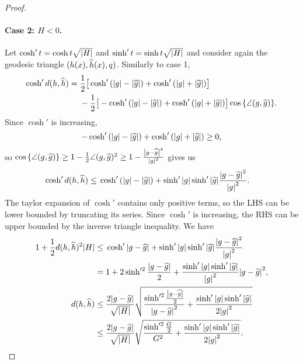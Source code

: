 \documentclass[english, a4paper, 12pt]{article}
\begin{document}
\begin{proof}
	\paragraph{Case 2: $H < 0$.}
	Let $\cosh'{t} = \cosh{t \sqrt{\abs{H}}}$ and $\sinh'{t} = \sinh{t \sqrt{\abs{H}}}$ and consider again the geodesic triangle $(h(x), \widehat{h}(x), q)$.
	Similarly to case 1,
	\begin{align}
		\cosh'{d(h, \mathhat{h})} ={}& \frac{1}{2} \big[
			\cosh'{(\abs{g} - \abs{\mathhat{g}})}
			+ \cosh'{(\abs{g} + \abs{\mathhat{g}})}
		\big]\\
		&- \frac{1}{2} \big[
			-\cosh'{(\abs{g} - \abs{\mathhat{g}})}
			+ \cosh'{(\abs{g} + \abs{\mathhat{g}})}
		\big] \cos{\left\{ \angle(g, \mathhat{g}) \right\}}.%
		\label{eq:exact_expression_for_cosh_of_rhs}
	\end{align}
	Since $\cosh'{}$ is increasing,
	\begin{align}
		-\cosh'{(\abs{g} - \abs{\widehat{g}})} + \cosh'{(\abs{g} + \abs{\widehat{g}})} \geq 0,
	\end{align}
	so $\cos{\left\{ \angle(g, \widehat{g}) \right\}} \geq 1 - \frac{1}{2} \angle(g, \widehat{g})^2 \geq 1 - \frac{\abs{g - \widehat{g}}^2}{\abs{g}^2}$ gives us
	\begin{align}
		\cosh'{d(h, \widehat{h})} \leq{}& \cosh'{(\abs{g} - \abs{\widehat{g}})} + \sinh'{\abs{g}} \sinh'{\abs{\widehat{g}}} \frac{\abs{g - \widehat{g}}^2}{\abs{g}^2}.
	\end{align}
	The taylor expansion of $\cosh'{}$ contains only positive terms, so the LHS can be lower bounded by truncating its series.
	Since $\cosh'{}$ is increasing, the RHS can be upper bounded by the inverse triangle inequality.
	We have
	\begin{align}
	1 + \frac{1}{2} d(h, \widehat{h})^2 \abs{H} \leq{}&
		\cosh'{\abs{g - \widehat{g}}}
		+ \sinh'{\abs{g}} \sinh'{\abs{\widehat{g}}} \frac{\abs{g - \widehat{g}}^2}{\abs{g}^2}\\
	={}& 1 + 2 \sinh'^2{\frac{\abs{g - \widehat{g}}}{2}} + \frac{\sinh'{\abs{g}} \sinh'{\abs{\widehat{g}}}}{\abs{g}^2} \abs{g - \widehat{g}}^2,\\
	d(h, \widehat{h})
	\leq{}& \frac{2 \abs{g - \widehat{g}}}{\sqrt{\abs{H}}} \sqrt{
		\frac{\sinh'^2{\frac{\abs{g - \widehat{g}}}{2}}}{\abs{g - \widehat{g}}^2}
		+ \frac{\sinh'{\abs{g}} \sinh'{\abs{\widehat{g}}}}{2 \abs{g}^2}
		}\\
	\leq{}& \frac{2 \abs{g - \widehat{g}}}{\sqrt{\abs{H}}} \sqrt{
		\frac{\sinh'^2{\frac{G}{2}}}{G^2}
		+ \frac{\sinh'{\abs{g}} \sinh'{\abs{\widehat{g}}}}{2 \abs{g}^2}
		}.
	\end{align}
\end{proof}
\end{document}
